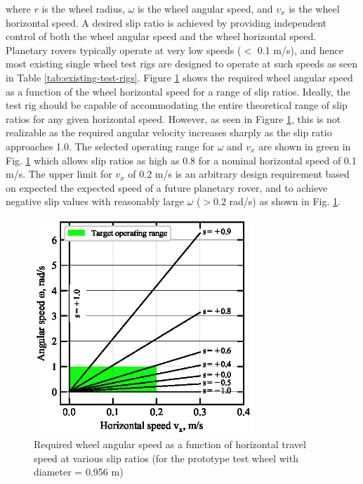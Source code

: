 \documentclass{article}
\begin{document}
where $r$ is the wheel radius, $\omega$ is the wheel angular speed, and $v_x$ is the wheel horizontal speed. A desired slip ratio is achieved by providing independent control of both the wheel angular speed and the wheel horizontal speed. Planetary rovers typically operate at very low speeds ($<$ 0.1 m/s), and hence most existing single wheel test rigs are designed to operate at such speeds as seen in Table \ref{tab:existing-test-rigs}. Figure \ref{fig:slip-ratio-chart} shows the required wheel angular speed as a function of the wheel horizontal speed for a range of slip ratios. Ideally, the test rig should be capable of accommodating the entire theoretical range of slip ratios for any given horizontal speed. However, as seen in Figure \ref{fig:slip-ratio-chart}, this is not realizable as the required angular velocity increases sharply as the slip ratio approaches 1.0. The selected operating range for $\omega$ and $v_x$ are shown in green in Fig. \ref{fig:slip-ratio-chart} which allows slip ratios as high as 0.8 for a nominal horizontal speed of 0.1 m/s. The upper limit for $v_x$ of 0.2 m/s is an arbitrary design requirement based on expected the expected speed of a future planetary rover, and to achieve negative slip values with reasonably large $\omega$ ($> 0.2$ rad/s) as shown in Fig. \ref{fig:slip-ratio-chart}. 


\begin{figure}[hbt!]
\centering
\includegraphics[width=3.25in]{plots/slip-ratios.eps}
\caption{Required wheel angular speed as a function of horizontal travel speed at various slip ratios (for the prototype test wheel with diameter = 0.956 m)}
\label{fig:slip-ratio-chart}
\end{figure}
\end{document}

